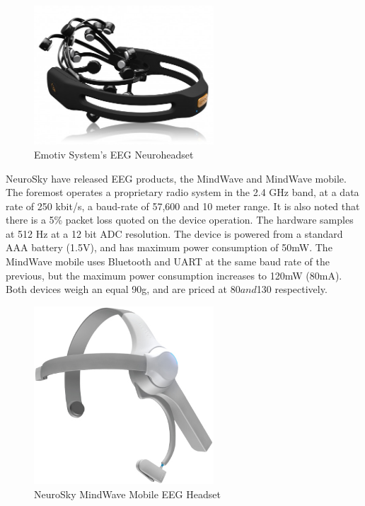 \documentclass[]{article}
\begin{document}
\begin{figure}[htb]
	\begin{center}
		\includegraphics[width = 0.6\textwidth]{emotive}
	\end{center}
	\caption{Emotiv System's \ac{EEG} Neuroheadset}
	\label{fig:emotive}
\end{figure}

NeuroSky have released \ac{EEG} products, the MindWave and MindWave mobile. The foremost operates a proprietary radio system in the 2.4 GHz band, at a data rate of 250 kbit/s, a baud-rate of 57,600 and 10 meter range. It is also noted that there is a 5\% packet loss quoted on the device operation. The hardware samples at 512 Hz at a 12 bit ADC resolution. The device is powered from a standard AAA battery (1.5V), and has maximum power consumption of 50mW. The MindWave mobile uses Bluetooth and UART at the same baud rate of the previous, but the maximum power consumption increases to 120mW (80mA). Both devices weigh an equal 90g, and are priced at $80 and $130 respectively. 

\begin{figure}[H]
	\begin{center}
		\includegraphics[width = 0.6\textwidth]{neurosky}
	\end{center}
	\caption{NeuroSky MindWave Mobile \ac{EEG}  Headset}
	\label{fig:neurosky}
\end{figure}
\end{document}
